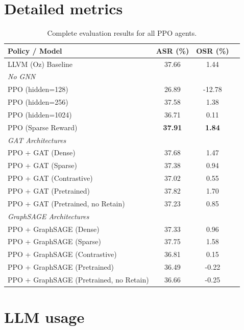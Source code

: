 \documentclass{article}
\theoremstyle{plain}
\theoremstyle{definition}
\theoremstyle{remark}
\begin{document}
\section{Detailed metrics}

\begin{table}[h]

\vskip 0.15in
\begin{center}
\begin{small}
\begin{tabular}{lccc}
\toprule
\textbf{Policy / Model} & \textbf{ASR (\%)} & \textbf{OSR (\%)} \\
\midrule
LLVM (Oz) Baseline & 37.66 & 1.44 \\
\midrule
\multicolumn{3}{l}{\textit{No GNN}} \\
PPO (hidden=128) & 26.89 & -12.78 \\
PPO (hidden=256) & 37.58 & 1.38 \\
PPO (hidden=1024) & 36.71 & 0.11 \\
PPO (Sparse Reward) & \textbf{37.91} & \textbf{1.84} \\
\midrule
\multicolumn{3}{l}{\textit{GAT Architectures}} \\
PPO + GAT (Dense) & 37.68 & 1.47 \\
PPO + GAT (Sparse) & 37.38 & 0.94 \\
PPO + GAT (Contrastive) & 37.02 & 0.55 \\
PPO + GAT (Pretrained) & 37.82 & 1.70 \\
PPO + GAT (Pretrained, no Retain) & 37.23 & 0.85 \\
\midrule
\multicolumn{3}{l}{\textit{GraphSAGE Architectures}} \\
PPO + GraphSAGE (Dense) & 37.33 & 0.96 \\
PPO + GraphSAGE (Sparse) & 37.75 & 1.58 \\
PPO + GraphSAGE (Contrastive) & 36.81 & 0.15 \\
PPO + GraphSAGE (Pretrained) & 36.49 & -0.22 \\
PPO + GraphSAGE (Pretrained, no Retain) & 36.66 & -0.25 \\
\bottomrule
\end{tabular}
\end{small}
\end{center}

\caption{Complete evaluation results for all PPO agents.}
\label{tab:inlining-results}
\vskip -0.1in
\end{table}

\section{LLM usage}
\end{document}
